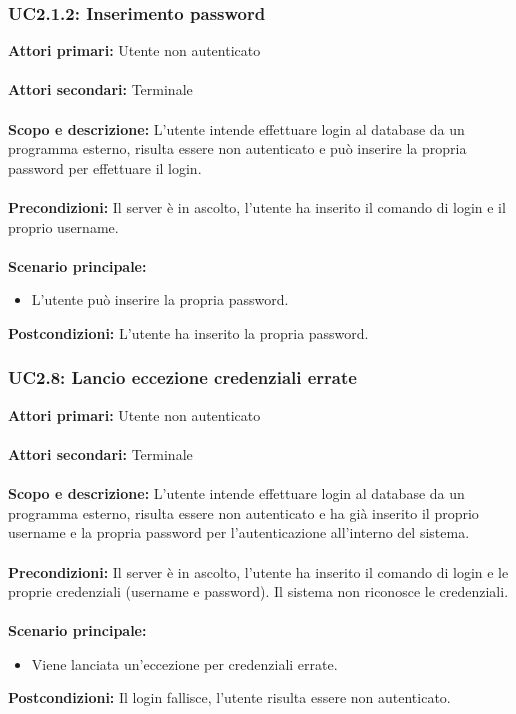 \documentclass{scalatekids-article}
\begin{document}
\subsubsection{UC2.1.2: Inserimento password}

\textbf{Attori primari:} Utente non autenticato\\ \\
\textbf{Attori secondari:} Terminale\\ \\
\textbf{Scopo e descrizione:}
L'utente intende effettuare login al database da un programma  esterno, risulta essere non autenticato e può inserire la propria password per effettuare il login.\\ \\
\textbf{Precondizioni:} Il server è in ascolto, l'utente ha inserito il comando di login e il proprio username.\\ \\
\textbf{Scenario principale:}
\begin{itemize}
\item L'utente può inserire la propria password.
\end{itemize}
\textbf{Postcondizioni:} L'utente ha inserito la propria password.

\subsubsection{UC2.8: Lancio eccezione credenziali errate}

\textbf{Attori primari:} Utente non autenticato\\ \\
\textbf{Attori secondari:} Terminale\\ \\
\textbf{Scopo e descrizione:}
L'utente intende effettuare login al database da un programma  esterno, risulta essere non autenticato e ha già inserito il proprio username e la propria password per l'autenticazione all'interno del sistema.\\ \\
\textbf{Precondizioni:} Il server è in ascolto, l'utente ha inserito il comando di login e le proprie credenziali (username e password). Il sistema non riconosce le credenziali.\\ \\
\textbf{Scenario principale:}
\begin{itemize}
\item Viene lanciata un'eccezione per credenziali errate.
\end{itemize}
\textbf{Postcondizioni:} Il login fallisce, l'utente risulta essere non autenticato.
\end{document}
